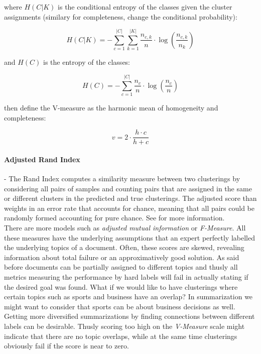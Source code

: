     where $H(C|K)$ is the conditional entropy of the classes given the cluster assignments (similary for completeness, change the conditional probability):

      \begin{equation}
        H(C|K) = - \sum_{c=1}^{|C|} \sum_{k=1}^{|K|} \frac{n_{c,k}}{n}\cdot \log\left(\frac{n_{c,k}}{n_k}\right)
      \end{equation}

    and $H(C)$ is the entropy of the classes:

      \begin{equation}
        H(C) = - \sum_{c=1}^{|C|} \frac{n_c}{n} \cdot \log\left(\frac{n_c}{n}\right)
      \end{equation}

    \cite{VMeasure2007} then define the V-measure as the harmonic mean of homogeneity and completeness:

      \begin{equation}
        v = 2 \cdot \frac{h \cdot c}{h + c}
      \end{equation}

    \paragraph{Adjusted Rand Index} - The Rand Index computes a similarity measure between two clusterings by considering all pairs of samples and counting pairs that are assigned in the same or different clusters in the predicted and true clusterings. The adjusted score than weights in an error rate that accounts for chance, meaning that all pairs could be randomly formed accounting for pure chance. See \cite{RandIndex1971} for more information.\\

  There are more models such as \emph{adjusted mutual information} or \emph{F-Measure}. All these measures have the underlying assumptions that an expert perfectly labelled the underlying topics of a document. Often, these scores are skewed, revealing information about total failure or an approximatively good solution. As said before documents can be partially assigned to different topics and thusly all metrics measuring the performance by hard labels will fail in actually stating if the desired goal was found. What if we would like to have clusterings where certain topics such as sports and business have an overlap? In summarization we might want to consider that sports can be about business decisions as well. Getting more diversified summarizations by finding connections between different labels can be desirable. Thusly scoring too high on the \emph{V-Measure} scale might indicate that there are no topic overlaps, while at the same time clusterings obviously fail if the score is near to zero.


